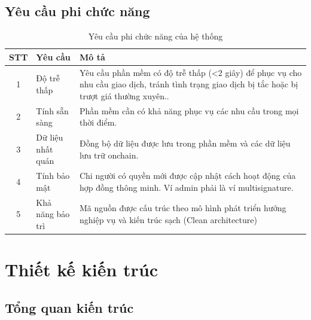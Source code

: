 \subsection{Yêu cầu phi chức năng}
\begin{table}[H]
    \centering
    \begin{tabular}{|c|p{3cm}|p{8cm}|}
        \hline
        \textbf{STT} & \textbf{Yêu cầu}  & \textbf{Mô tả}                                               \\
        \hline
        1            & Độ trễ thấp       & Yêu cầu phần mềm có độ trễ thấp (<2 giây) để phục vụ cho nhu
        cầu giao dịch, tránh tình trạng giao dịch bị tắc hoặc bị trượt giá thường
        xuyên..                                                                                         \\
        \hline
        2            & Tính sẵn sàng     & Phần mềm cần có khả năng phục vụ các nhu cầu trong mọi thời
        điểm.                                                                                           \\
        \hline
        3            & Dữ liệu nhất quán & Đồng bộ dữ liệu được lưu trong phần mềm và các dữ liệu
        lưu trữ onchain.                                                                                \\
        \hline
        4            & Tính bảo mật      & Chi người có quyền mới được cập nhật cách hoạt động của hợp
        đồng thông minh. Ví admin phải là ví multisignature.                                            \\
        \hline
        5            & Khả năng bảo trì  & Mã nguồn được cấu trúc theo mô hình phát triển hướng
        nghiệp vụ và kiến trúc sạch (Clean architecture)                                                \\
        \hline
    \end{tabular}
    \caption{Yêu cầu phi chức năng của hệ thống}
    \label{tab:non-functional-requirements}
\end{table}

\section{Thiết kế kiến trúc}

\subsection{Tổng quan kiến trúc}

